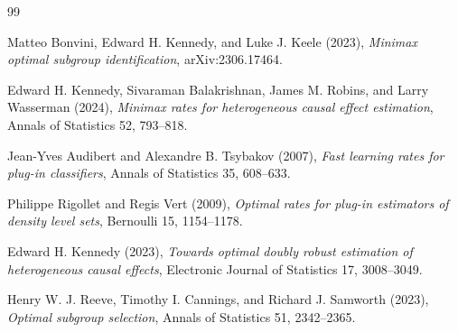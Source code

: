 \documentclass{article}
\begin{document}
\begin{thebibliography}{99}

   Matteo Bonvini, Edward H. Kennedy, and Luke J. Keele (2023), \emph{Minimax optimal subgroup identification}, arXiv:2306.17464.

   Edward H. Kennedy, Sivaraman Balakrishnan, James M. Robins, and Larry Wasserman (2024), \emph{Minimax rates for heterogeneous causal effect estimation}, Annals of Statistics 52, 793--818.

   Jean-Yves Audibert and Alexandre B. Tsybakov (2007), \emph{Fast learning rates for plug-in classifiers}, Annals of Statistics 35, 608--633.

   Philippe Rigollet and Regis Vert (2009), \emph{Optimal rates for plug-in estimators of density level sets}, Bernoulli 15, 1154--1178.

   Edward H. Kennedy (2023), \emph{Towards optimal doubly robust estimation of heterogeneous causal effects}, Electronic Journal of Statistics 17, 3008--3049.

   Henry W. J. Reeve, Timothy I. Cannings, and Richard J. Samworth (2023), \emph{Optimal subgroup selection}, Annals of Statistics 51, 2342--2365.

\end{thebibliography}
\end{document}
